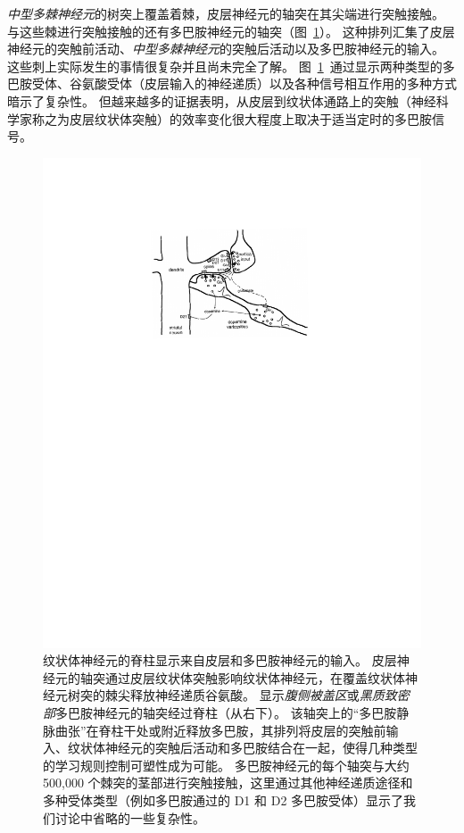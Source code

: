 \textit{中型多棘神经元}的树突上覆盖着棘，皮层神经元的轴突在其尖端进行突触接触。
与这些棘进行突触接触的还有多巴胺神经元的轴突（图~\ref{fig:12_2}）。
这种排列汇集了皮层神经元的突触前活动、\textit{中型多棘神经元}的突触后活动以及多巴胺神经元的输入。
这些刺上实际发生的事情很复杂并且尚未完全了解。
图~\ref{fig:12_2}~通过显示两种类型的多巴胺受体、谷氨酸受体（皮层输入的神经递质）以及各种信号相互作用的多种方式暗示了复杂性。
但越来越多的证据表明，从皮层到纹状体通路上的突触（神经科学家称之为皮层纹状体突触）的效率变化很大程度上取决于适当定时的多巴胺信号。



\begin{figure}[!htb]
	\centering
	\includegraphics[width=0.7\linewidth]{chap12/fig_12_2}
	\caption{纹状体神经元的脊柱显示来自皮层和多巴胺神经元的输入。
		皮层神经元的轴突通过皮层纹状体突触影响纹状体神经元，在覆盖纹状体神经元树突的棘尖释放神经递质谷氨酸。
		显示\textit{腹侧被盖区}或\textit{黑质致密部}多巴胺神经元的轴突经过脊柱（从右下）。
		该轴突上的“多巴胺静脉曲张”在脊柱干处或附近释放多巴胺，其排列将皮层的突触前输入、纹状体神经元的突触后活动和多巴胺结合在一起，使得几种类型的学习规则控制可塑性成为可能。
		多巴胺神经元的每个轴突与大约 500,000 个棘突的茎部进行突触接触，这里通过其他神经递质途径和多种受体类型（例如多巴胺通过的 D1 和 D2 多巴胺受体）显示了我们讨论中省略的一些复杂性\cite{schultz1998predictive}。
		\label{fig:12_2}}
\end{figure}



